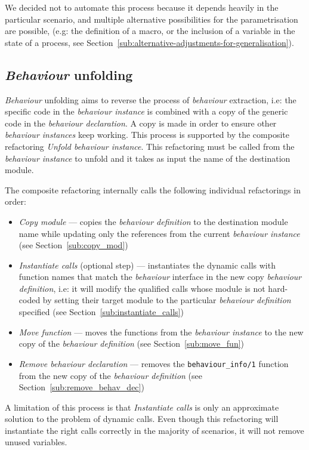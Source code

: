 We decided not to automate this process because it depends heavily
in the particular scenario, and multiple alternative possibilities
for the parametrisation are possible, (e.g: the definition of a macro,
or the inclusion of a variable in the state of a process, see 
Section~\ref{sub:alternative-adjustments-for-generalisation}).


\subsection{\emph{Behaviour} unfolding\label{sec:behaviour-unfolding}}

\emph{Behaviour} unfolding aims to reverse the process of \emph{behaviour}
extraction, i.e: the specific code in the \emph{behaviour instance}
is combined with a copy of the generic code in the \emph{behaviour
declaration}. A copy is made in order to ensure other \emph{behaviour
instances} keep working. This process is supported by the composite
refactoring \emph{Unfold behaviour instance}. This refactoring must
be called from the \emph{behaviour instance} to unfold and it takes
as input the name of the destination module.

The composite refactoring internally calls the following individual
refactorings in order:
\begin{itemize}
\item \emph{Copy module} --- copies the \emph{behaviour definition} to the
destination module name while updating only the references from the
current \emph{behaviour instance} (see Section~\ref{sub:copy_mod})
\item \emph{Instantiate calls} (optional step) --- instantiates the dynamic
calls with function names that match the \emph{behaviour} interface
in the new copy \emph{behaviour definition}, i.e: it will modify the
qualified calls whose module is not hard-coded by setting their target
module to the particular \emph{behaviour definition} specified (see
Section~\ref{sub:instantiate_calls})
\item \emph{Move function} --- moves the functions from the \emph{behaviour
instance} to the new copy of the \emph{behaviour definition} (see
Section~\ref{sub:move_fun})
\item \emph{Remove behaviour declaration} --- removes the \texttt{behaviour\_info/1}
function from the new copy of the \emph{behaviour definition} (see
Section~\ref{sub:remove_behav_dec})
\end{itemize}
A limitation of this process is that \emph{Instantiate calls} is only
an approximate solution to the problem of dynamic calls. Even though
this refactoring will instantiate the right calls correctly in the
majority of scenarios, it will not remove unused variables.

